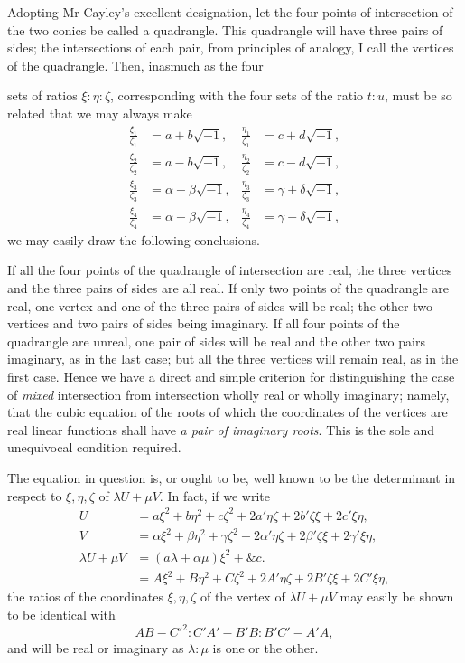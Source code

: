 \documentclass[11pt]{article}
\newcommand{\sourcepage}[1]{\marginpar{\scriptsize p.~#1}}
\begin{document}
{{Adopting Mr Cayley's excellent designation, let the four points of intersection of the two conics be called a quadrangle. This quadrangle will have three pairs of sides; the intersections of each pair, from principles of analogy, I call the vertices of the quadrangle. Then, inasmuch as the four

\sourcepage{120}
sets of ratios $\xi:\eta:\zeta$, corresponding with the four sets of the ratio $t:u$, must be so related that we may always make
\[
\begin{aligned}
\frac{\xi_1}{\zeta_1}&=a+b\sqrt{-1},&
\frac{\eta_1}{\zeta_1}&=c+d\sqrt{-1},\\
\frac{\xi_2}{\zeta_2}&=a-b\sqrt{-1},&
\frac{\eta_2}{\zeta_2}&=c-d\sqrt{-1},\\
\frac{\xi_3}{\zeta_3}&=\alpha+\beta\sqrt{-1},&
\frac{\eta_3}{\zeta_3}&=\gamma+\delta\sqrt{-1},\\
\frac{\xi_4}{\zeta_4}&=\alpha-\beta\sqrt{-1},&
\frac{\eta_4}{\zeta_4}&=\gamma-\delta\sqrt{-1},
\end{aligned}
\]
we may easily draw the following conclusions.

If all the four points of the quadrangle of intersection are real, the three vertices and the three pairs of sides are all real. If only two points of the quadrangle are real, one vertex and one of the three pairs of sides will be real; the other two vertices and two pairs of sides being imaginary. If all four points of the quadrangle are unreal, one pair of sides will be real and the other two pairs imaginary, as in the last case; but all the three vertices will remain real, as in the first case. Hence we have a direct and simple criterion for distinguishing the case of \emph{mixed} intersection from intersection wholly real or wholly imaginary; namely, that the cubic equation of the roots of which the coordinates of the vertices are real linear functions shall have \emph{a pair of imaginary roots}. This is the sole and unequivocal condition required.

The equation in question is, or ought to be, well known to be the determinant in respect to $\xi,\eta,\zeta$ of $\lambda U+\mu V$. In fact, if we write
\[
\begin{aligned}
U&=a\xi^2+b\eta^2+c\zeta^2+2a'\eta\zeta+2b'\zeta\xi+2c'\xi\eta,\\
V&=\alpha\xi^2+\beta\eta^2+\gamma\zeta^2+2\alpha'\eta\zeta+2\beta'\zeta\xi+2\gamma'\xi\eta,\\
\lambda U+\mu V&=(a\lambda+\alpha\mu)\xi^2+\&c.\\
&=A\xi^2+B\eta^2+C\zeta^2+2A'\eta\zeta+2B'\zeta\xi+2C'\xi\eta,
\end{aligned}
\]
the ratios of the coordinates $\xi,\eta,\zeta$ of the vertex of $\lambda U+\mu V$ may easily be shown to be identical with
\[
AB-C'^2:C'A'-B'B:B'C'-A'A,
\]
and will be real or imaginary as $\lambda:\mu$ is one or the other.

}}
\end{document}
